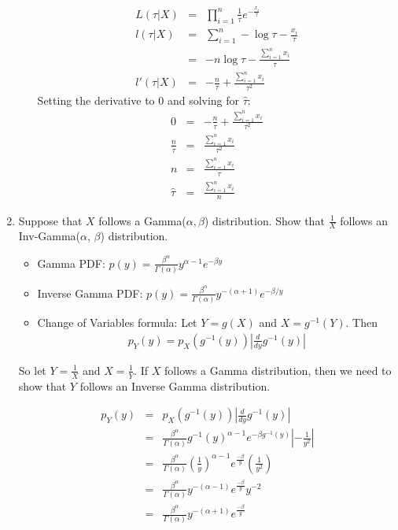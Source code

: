 \documentclass[10pt,a4paper]{article}
\newcommand{\red}{\color{red}}
\newcommand{\black}{\color{black}}
\begin{document}
\begin{enumerate}
\begin{enumerate}
\medskip \red
\begin{eqnarray*}
L(\tau | X) &=& \prod_{i=1}^n \frac{1}{\tau} e^{-\frac{x_i}{\tau}} \\
l(\tau | X) &=& \sum_{i=1}^n - \log \tau - \frac{x_i}{\tau} \\
&=& - n \log \tau - \frac{\sum_{i=1}^n x_i}{\tau} \\
l'(\tau | X) &=& -\frac{n}{\tau} + \frac{\sum_{i=1}^n x_i}{\tau^2}
\end{eqnarray*}
Setting the derivative to 0 and solving for $\hat{\tau}$:
\begin{eqnarray*}
0 &=& -\frac{n}{\tau} + \frac{\sum_{i=1}^n x_i}{\tau^2} \\
\frac{n}{\tau} &=& \frac{\sum_{i=1}^n x_i}{\tau^2} \\
n &=& \frac{\sum_{i=1}^n x_i}{\tau} \\
\hat{\tau} &=& \frac{\sum_{i=1}^n x_i}{n}
\end{eqnarray*}
\black 
\end{enumerate}

\bigskip

\item Suppose that $X$ follows a Gamma($\alpha, \beta$) distribution.  Show that $\frac{1}{X}$ follows an Inv-Gamma($\alpha$, $\beta$) distribution.

\begin{itemize}
\item Gamma PDF: $p(y) = \frac{\beta^{\alpha}}{\Gamma(\alpha)} y^{\alpha-1} e^{-\beta y}$
\item Inverse Gamma PDF: $p(y) = \frac{\beta^{\alpha}}{\Gamma(\alpha)} y^{-(\alpha+1)} e^{-\beta/y}$
\item Change of Variables formula: Let $Y = g(X)$ and $X = g^{-1}(Y)$.  Then 
\begin{eqnarray*}
p_Y(y) = p_X(g^{-1}(y)) \left \vert \frac{d}{dy} g^{-1}(y) \right \vert
\end{eqnarray*}
\end{itemize}

\medskip \red

So let $Y = \frac{1}{X}$ and $X = \frac{1}{Y}$.  If $X$ follows a Gamma distribution, then we need to show that $Y$ follows an Inverse Gamma distribution.

\begin{eqnarray*}
p_Y(y) &=& p_X(g^{-1}(y)) \left \vert \frac{d}{dy} g^{-1}(y) \right \vert \\
&=& \frac{\beta^{\alpha}}{\Gamma(\alpha)} g^{-1}(y)^{\alpha-1} e^{-\beta g^{-1}(y)} \left \vert - \frac{1}{y^2}  \right \vert \\
&=& \frac{\beta^{\alpha}}{\Gamma(\alpha)} \left( \frac{1}{y} \right)^{\alpha-1} e^{\frac{-\beta}{y}} \left( \frac{1}{y^2}  \right) \\ 
&=& \frac{\beta^{\alpha}}{\Gamma(\alpha)} y^{-(\alpha-1)} e^{\frac{-\beta}{y}} y^{-2}   \\
&=& \frac{\beta^{\alpha}}{\Gamma(\alpha)} y^{-(\alpha+1)} e^{\frac{-\beta}{y}}  
\end{eqnarray*}


\end{enumerate}
\end{document}
